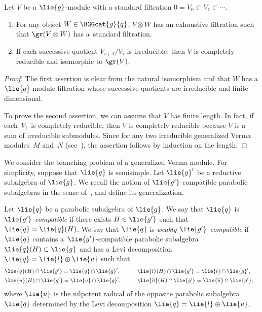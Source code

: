 \begin{Proposition}\label{prop:CompletelyReducibleVerma}
	Let $V$ be a $\lie{g}$-module with a standard filtration $0 = V_0\subset V_1 \subset \cdots$.
	\begin{enumerate}\itemsep=0pt
		\item[$1.$] For any object $W\in \BGGcat{g}{q}$, $V \otimes W$ has an exhaustive filtration such that $\gr(V\otimes W)$ has a~standard filtration.
		\item[$2.$] If each successive quotient $V_{i+1}/V_{i}$ is irreducible, then $V$ is completely reducible and isomorphic to $\gr(V)$.
	\end{enumerate}
\end{Proposition}

\begin{proof}
	The first assertion is clear from the natural isomorphism 
	and that $W$ has a $\lie{q}$-module filtration whose successive quotients are irreducible and finite-dimensional.

	To prove the second assertion, we can assume that $V$ has finite length.
	In fact, if each~$V_i$~is completely reducible, then $V$ is completely reducible
	because $V$ is a sum of irreducible submod\-ules.
	Since  for any two irreducible generalized Verma modules~$M$ and~$N$ (see~\cite[Theorem~3.3\,(d)]{Hu08_category_o}),
	the assertion follows by induction on the length.
\end{proof}

We consider the branching problem of a generalized Verma module.
For simplicity, suppose that $\lie{g}$ is semisimple.
Let $\lie{g}'$ be a reductive subalgebra of $\lie{g}$.
We recall the notion of $\lie{g'}$-compatible parabolic subalgebras in the sense of~\cite{Ko12_generalized_Verma},
and define its generalization.

\begin{Definition}\label{def:WeaklyCompatible}
	Let $\lie{q}$ be a parabolic subalgebra of $\lie{g}$.
	We say that $\lie{q}$ is \emph{$\lie{g'}$-compatible} if there exists $H \in \lie{g'}$ such that $\lie{q} = \lie{q}(H)$.
	We say that $\lie{q}$ is \emph{weakly $\lie{g'}$-compatible} if $\lie{q}$ contains a~$\lie{g'}$-compatible parabolic subalgebra $\lie{q}(H) \subset \lie{g}$ and has a Levi decomposition $\lie{q} = \lie{l} \oplus \lie{u}$ such that
	\begin{alignat}{3}
		&\lie{q}(H) \cap \lie{g'} = \lie{q} \cap \lie{g}', \qquad&& \lie{l}(H)\cap \lie{g'} = \lie{l} \cap \lie{g}',& \nonumber \\
		&\lie{u}(H)\cap \lie{g'} = \lie{u} \cap \lie{g}', \qquad&& \lie{\overline{u}}(H)\cap \lie{g'} = \lie{\overline{u}} \cap \lie{g'},& \label{eqn:WeaklyCompatible}
	\end{alignat}
	where $\lie{\overline{u}}$ is the nilpotent radical of the opposite parabolic subalgebra $\lie{\overline{q}}$ determined by the Levi decomposition $\lie{q} = \lie{l}\oplus \lie{u}$.
\end{Definition}

